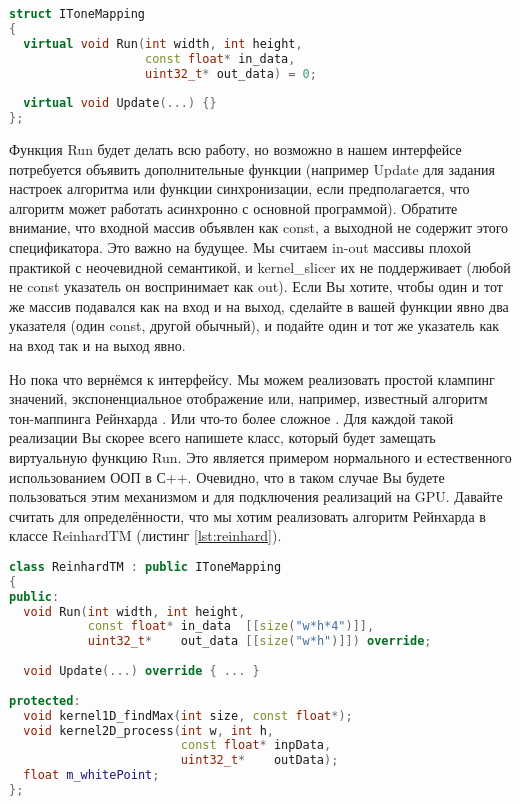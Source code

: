 \documentclass[11pt,fleqn,english,russian]{report} %
\begin{document}
\begin{lstlisting}[language=C++, caption=интерфейс алгоритмов тон-маппинга]
struct IToneMapping
{
  virtual void Run(int width, int height, 
                   const float* in_data,
                   uint32_t* out_data) = 0;
                   
  virtual void Update(...) {}                 
};
\end{lstlisting}\label{lst:tonemapping_api2}

Функция Run будет делать всю работу, но возможно в нашем интерфейсе потребуется объявить дополнительные функции (например Update для задания настроек алгоритма или функции синхронизации, если предполагается, что алгоритм может работать асинхронно с основной программой). Обратите внимание, что входной массив объявлен как const, а выходной не содержит этого спецификатора. Это важно на будущее. Мы считаем in-out массивы плохой практикой с неочевидной семантикой, и kernel\_slicer их не поддерживает (любой не const указатель он воспринимает как out). Если Вы хотите, чтобы один и тот же массив подавался как на вход и на выход, сделайте в вашей функции явно два указателя (один const, другой обычный), и подайте один и тот же указатель как на вход так и на выход явно.  

Но пока что вернёмся к интерфейсу. Мы можем реализовать простой клампинг значений, экспоненциальное отображение или, например, известный алгоритм тон-маппинга Рейнхарда \cite{Reinhard05}. Или что-то более сложное \cite{Mantiuk08}. Для каждой такой реализации Вы скорее всего напишете класс, который будет замещать виртуальную функцию Run. Это является примером нормального и естественного использованием ООП в С++. Очевидно, что в таком случае Вы будете пользоваться этим механизмом и для подключения реализаций на GPU. Давайте считать для определённости, что мы хотим реализовать алгоритм Рейнхарда в классе ReinhardTM (листинг \ref{lst:reinhard}).

\begin{lstlisting}[language=C++, 
	               caption=класс для алгоритма Рейнхарда, 
	               label=lst:reinhard]	
class ReinhardTM : public IToneMapping
{
public:
  void Run(int width, int height, 
           const float* in_data  [[size("w*h*4")]], 
           uint32_t*    out_data [[size("w*h")]]) override;
		   
  void Update(...) override { ... }
   	
protected:
  void kernel1D_findMax(int size, const float*);
  void kernel2D_process(int w, int h, 
                        const float* inpData, 
                        uint32_t*    outData);
  float m_whitePoint;
};
\end{lstlisting}
\end{document}
